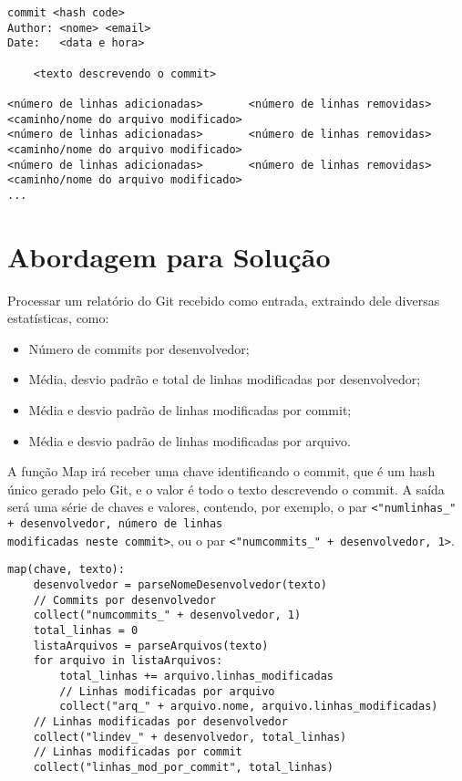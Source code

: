 \begin{tiny}
\begin{verbatim}
commit <hash code>
Author: <nome> <email>
Date:   <data e hora>

    <texto descrevendo o commit>

<número de linhas adicionadas>       <número de linhas removidas>       <caminho/nome do arquivo modificado>
<número de linhas adicionadas>       <número de linhas removidas>       <caminho/nome do arquivo modificado>
<número de linhas adicionadas>       <número de linhas removidas>       <caminho/nome do arquivo modificado>
...
\end{verbatim}
\end{tiny}

\section{Abordagem para Solução}

Processar um relatório do Git recebido como entrada, extraindo dele diversas estatísticas, como:
\begin{itemize}
\item Número de commits por desenvolvedor;
\item Média, desvio padrão e total de linhas modificadas por desenvolvedor;
\item Média e desvio padrão de linhas modificadas por commit;
\item Média e desvio padrão de linhas modificadas por arquivo.
\end{itemize}

A função Map irá receber uma chave identificando o commit, que é um hash único gerado pelo Git,
e o valor é todo o texto descrevendo o commit. A saída será uma série de chaves e valores,
contendo, por exemplo, o par \texttt{<"numlinhas\_" + desenvolvedor, número de linhas \\
modificadas neste commit>}, 
ou o par \texttt{<"numcommits\_" + desenvolvedor, 1>}.

\begin{verbatim}
map(chave, texto):
    desenvolvedor = parseNomeDesenvolvedor(texto)
    // Commits por desenvolvedor
    collect("numcommits_" + desenvolvedor, 1)
    total_linhas = 0
    listaArquivos = parseArquivos(texto)
    for arquivo in listaArquivos:
        total_linhas += arquivo.linhas_modificadas
        // Linhas modificadas por arquivo
        collect("arq_" + arquivo.nome, arquivo.linhas_modificadas)
    // Linhas modificadas por desenvolvedor
    collect("lindev_" + desenvolvedor, total_linhas)
    // Linhas modificadas por commit
    collect("linhas_mod_por_commit", total_linhas)
\end{verbatim}

